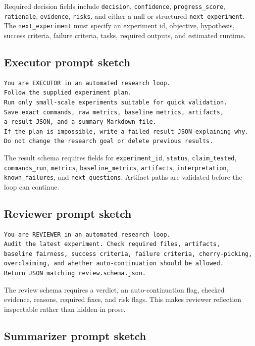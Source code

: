 \documentclass{article}
\begin{document}
Required decision fields include \texttt{decision}, \texttt{confidence}, \texttt{progress\_score}, \texttt{rationale}, \texttt{evidence}, \texttt{risks}, and either a null or structured \texttt{next\_experiment}. The \texttt{next\_experiment} must specify an experiment id, objective, hypothesis, success criteria, failure criteria, tasks, required outputs, and estimated runtime.

\subsection{Executor prompt sketch}

\begin{verbatim}
You are EXECUTOR in an automated research loop.
Follow the supplied experiment plan.
Run only small-scale experiments suitable for quick validation.
Save exact commands, raw metrics, baseline metrics, artifacts,
a result JSON, and a summary Markdown file.
If the plan is impossible, write a failed result JSON explaining why.
Do not change the research goal or delete previous results.
\end{verbatim}

The result schema requires fields for \texttt{experiment\_id}, \texttt{status}, \texttt{claim\_tested}, \texttt{commands\_run}, \texttt{metrics}, \texttt{baseline\_metrics}, \texttt{artifacts}, \texttt{interpretation}, \texttt{known\_failures}, and \texttt{next\_questions}. Artifact paths are validated before the loop can continue.

\subsection{Reviewer prompt sketch}

\begin{verbatim}
You are REVIEWER in an automated research loop.
Audit the latest experiment. Check required files, artifacts,
baseline fairness, success criteria, failure criteria, cherry-picking,
overclaiming, and whether auto-continuation should be allowed.
Return JSON matching review.schema.json.
\end{verbatim}

The review schema requires a verdict, an auto-continuation flag, checked evidence, reasons, required fixes, and risk flags. This makes reviewer reflection inspectable rather than hidden in prose.

\subsection{Summarizer prompt sketch}
\end{document}

